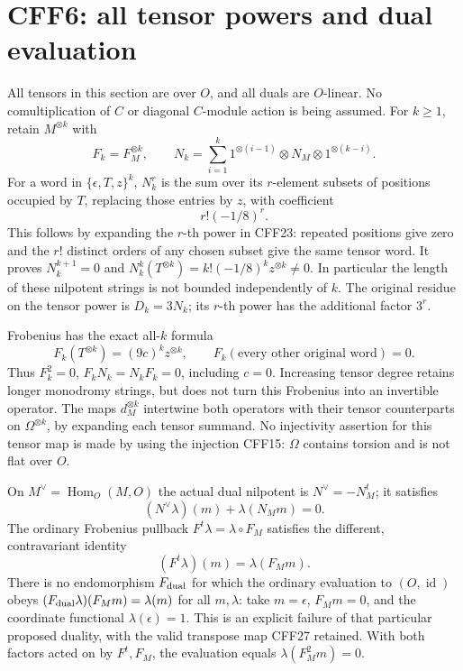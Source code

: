 \documentclass[11pt]{article}
\newcommand{\id}{\operatorname{id}}
\begin{document}
\section{CFF6: all tensor powers and dual evaluation}
All tensors in this section are over \(O\), and all duals are
\(O\)-linear. No comultiplication of \(C\) or diagonal
\(C\)-module action is being assumed.
For \(k\ge1\), retain \(M^{\otimes k}\) with
\[
 F_k=F_M^{\otimes k},\qquad
 N_k=\sum_{i=1}^k1^{\otimes(i-1)}\otimes N_M\otimes
                       1^{\otimes(k-i)} .
 \tag{CFF23}
\]
For a word in \(\{\epsilon,T,z\}^k\), \(N_k^r\) is the sum over
its \(r\)-element subsets of positions occupied by \(T\),
replacing those entries by \(z\), with coefficient
\[
                         r!(-1/8)^r .
 \tag{CFF24}
\]
This follows by expanding the \(r\)-th power in CFF23: repeated
positions give zero and the \(r!\) distinct orders of any
chosen subset give the same tensor word. It proves
\(N_k^{k+1}=0\) and \(N_k^k(T^{\otimes k})=
k!(-1/8)^k z^{\otimes k}\ne0\). In particular the length
of these nilpotent strings is not bounded independently of \(k\).
The original residue on the tensor power is \(D_k=3N_k\);
its \(r\)-th power has the additional factor \(3^r\).

Frobenius has the exact all-\(k\) formula
\[
 F_k(T^{\otimes k})=(9c)^kz^{\otimes k},\qquad
 F_k(\text{every other original word})=0.
 \tag{CFF25}
\]
Thus \(F_k^2=0\), \(F_kN_k=N_kF_k=0\), including \(c=0\).
Increasing tensor degree retains longer monodromy strings,
but does not turn this Frobenius into an invertible operator.
The maps \(d_M^{\otimes k}\) intertwine both operators with
their tensor counterparts on \(\Omega^{\otimes k}\), by
expanding each tensor summand. No injectivity assertion for
this tensor map is made by using the injection CFF15:
\(\Omega\) contains torsion and is not flat over \(O\).

On \(M^\vee=\operatorname{Hom}_O(M,O)\) the actual dual
nilpotent is \(N^\vee=-N_M^t\); it satisfies
\[
 (N^\vee\lambda)(m)+\lambda(N_Mm)=0 .
 \tag{CFF26}
\]
The ordinary Frobenius pullback \(F^t\lambda=\lambda\circ F_M\)
satisfies the different, contravariant identity
\[
 (F^t\lambda)(m)=\lambda(F_Mm).
 \tag{CFF27}
\]
There is no endomorphism \(F_{\rm dual}\) for which the
ordinary evaluation to \((O,\id)\) obeys
\((F_{\rm dual}\lambda)(F_Mm)=\lambda(m)\) for all \(m,\lambda\):
take \(m=\epsilon\), \(F_Mm=0\), and the coordinate functional
\(\lambda(\epsilon)=1\). This is an explicit failure of that
particular proposed duality, with the valid transpose map
CFF27 retained. With both factors acted on by \(F^t,F_M\),
the evaluation equals \(\lambda(F_M^2m)=0\).
\end{document}
